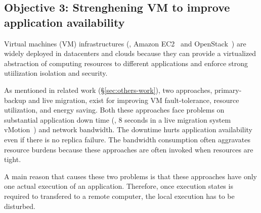\vspace{-.15in}\subsection{Objective 3: Strenghening VM to improve application 
availability}\label{sec:vm}\vspace{-.075in}




Virtual machines (VM) infrastructures (\eg, Amazon EC2~\cite{amazon:vpc} and 
OpenStack~\cite{openstack}) are widely deployed in datacenters and clouds 
because they can provide a virtualized abstraction of computing resources to 
different applications and enforce strong utiilization isolation and security. 

As mentioned in related work (\S\ref{sec:others-work}), two approaches, 
primary-backup and live migration, exist for improving VM fault-tolerance, 
resource utilization, and energy saving. Both these approaches face problems on 
substantial application down time (\eg, 8 seconds in a live migration system 
vMotion~\cite{vmotion:atc05}) and network bandwidth. The downtime hurts 
application availability even if there is no replica failure. The bandwidth 
consumption often aggravates resource burdens because these approaches are often 
invoked when resources are tight.

A main reason that causes these two problems is that these approaches have only 
one actual execution of an application. Therefore, once execution states is 
required to transfered to a remote computer, the local execution has to be 
disturbed.



% 



